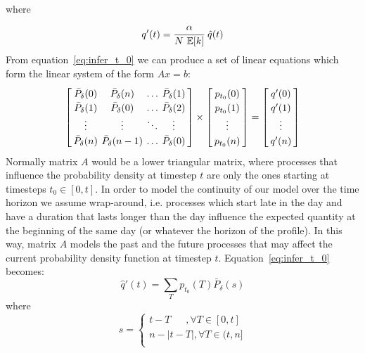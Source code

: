 \documentclass[conference]{IEEEtran}
\begin{document}
where 
\[
q'(t) = \cfrac{\alpha}{N~\mathbb{E}[k]}~\hat{q}(t)
\]
From equation~\eqref{eq:infer_t_0} we can produce a set of linear equations which form the linear system of the form $Ax = b$:
\begin{equation}\label{eq:linearSystem}
\arraycolsep=2pt\def\arraystretch{1.2}
\left[\begin{array}{cccc}  
 \bar{P}_{\delta}(0)  & \bar{P}_{\delta}(n) & \ldots  & \bar{P}_{\delta}(1)\\
 \bar{P}_{\delta}(1)  & \bar{P}_{\delta}(0) & \ldots  & \bar{P}_{\delta}(2)\\
\vdots  & \vdots & \ddots  & \vdots\\
 \bar{P}_{\delta}(n)  & \bar{P}_{\delta}(n-1) & \ldots  & \bar{P}_{\delta}(0)
\end{array}\right]
\times
\left[\begin{array}{c}  
 p_{t_0}(0) \\ 
  p_{t_0}(1) \\
 \vdots \\
 p_{t_0}(n) \\  
\end{array}\right]
=
\left[\begin{array}{c}  
 q'(0) \\ 
  q'(1) \\ 
 \vdots \\
 q'(n) \\  
\end{array}\right]
\end{equation}
Normally matrix $A$ would be a lower triangular matrix, where processes that influence the probability density at timestep $t$ are only the ones starting at timesteps $t_0 \in [0, t]$. In order to model the continuity of our model over the time horizon we assume wrap-around, i.e. processes which start late in the day and have a duration that lasts longer than the day influence the expected quantity at the beginning of the same day (or whatever the horizon of the profile). In this way, matrix $A$ models the past and the future processes that may affect the current probability density function at timestep $t$. Equation~\eqref{eq:infer_t_0} becomes:
\begin{equation}\label{eq:infer_t_0_axis}
\hat{q}'(t) = \sum_{T} p_{t_0}(T) \bar{P}_{\delta} (s)
\end{equation}
where
\begin{equation*}
s =
\left\lbrace
\begin{array}{l}
 t-T~~~~~~~,\forall T \in [0, t]\\
 n-|t-T|,\forall T \in (t, n]\\
\end{array}
\right.
\end{equation*}
\end{document}
